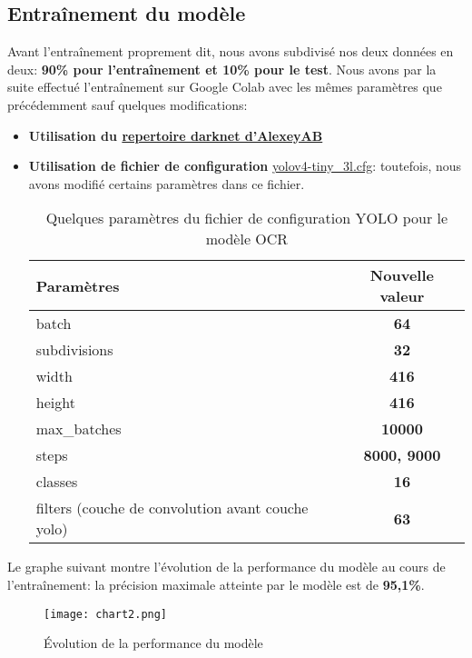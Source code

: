     \subsection{Entraînement du modèle}
    Avant l’entraînement proprement dit, nous avons subdivisé nos deux données en deux: \textbf{90\% pour l’entraînement et 10\% pour le test}. Nous avons par la suite effectué l’entraînement sur Google Colab avec les mêmes paramètres que précédemment sauf quelques modifications:
    \begin{itemize}
        \item \textbf{Utilisation du \href{https://github.com/AlexeyAB/darknet/}{repertoire darknet d'AlexeyAB}}
        \item \textbf{Utilisation de fichier de configuration} \href{https://github.com/AlexeyAB/darknet/blob/master/cfg/yolov4-tiny-3l.cfg}{yolov4-tiny\_3l.cfg}: toutefois, nous avons modifié certains paramètres dans ce fichier.
        \begin{table}[H]
            \centering
            \begin{tabular}{|l|c|}
                \hline
                \rowcolor{Gray}
                \textbf{Paramètres} & \textbf{Nouvelle valeur} \\ \hline
                batch & \textbf{64} \\ \hline
                subdivisions & \textbf{32} \\ \hline
                width & \textbf{416} \\ \hline
                height & \textbf{416} \\ \hline
                max\_batches & \textbf{10000} \\ \hline
                steps & \textbf{8000, 9000} \\ \hline
                classes & \textbf{16} \\ \hline
                filters (couche de convolution avant couche yolo) & \textbf{63} \\ \hline 
            \end{tabular}
            \caption{Quelques paramètres du fichier de configuration YOLO pour le modèle OCR}
        \end{table}
    \end{itemize}
    Le graphe suivant montre l'évolution de la performance du modèle au cours de l'entraînement: la précision maximale atteinte par le modèle est de \textbf{95,1\%}.
        \begin{figure}[H]
            \centering
            \texttt{[image: chart2.png]}
            \caption{Évolution de la performance du modèle}
        \end{figure}
